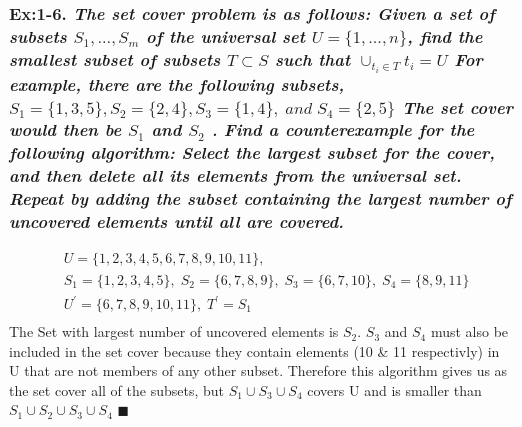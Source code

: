 \subsubsection*{\textbf{\enspace Ex:1-6.} \emph{\textbf{The set cover problem is as follows: } Given a set of subsets $S_{1}, ..., S_{m}$ of the universal set 
$U = \{1, ..., n\}$, 
find the smallest subset of subsets 
$T \subset S$ 
such that  
$\cup_{t_{i} \in T}t_{i} = U$ For example, there are the following subsets, $S_{1} = \{1, 3, 5\}, S_{2} = \{2, 4\}, S_{3} = \{1, 4\}, \; and \; S_{4} = \{2, 5\}$ The set cover would then be $S_{1}$ and $S_{2}$ . } 
\emph{\textbf{Find a counterexample for the following algorithm:} Select the largest subset for the cover, and then delete all its elements from the universal set. Repeat by adding the subset containing the largest number of uncovered elements until all are covered.}}
{\color{answer}{}
\begin{align*}
	&U = \{1,2,3,4,5,6,7,8,9,10,11\}, \\
	&S_{1} = \{1,2,3,4,5\}, \; S_{2} = \{6,7,8,9\}, \; S_{3} = \{6,7,10\}, \; S_{4} = \{8,9,11\} \\
	&U^{'} = \{6,7,8,9,10,11\}, \; T^{'} = S_{1} \\
\end{align*}
The Set with largest number of uncovered elements is $S_{2}$. $S_{3}$ and $S_{4}$ must also be included in the set cover because they contain elements (10 \& 11 respectivly)
in U that are not members of any other subset. Therefore this algorithm gives us as the set cover all of the subsets, but $S_{1} \cup S_{3} \cup S_{4}$ covers U and is smaller
than $S_{1} \cup S_{2} \cup S_{3} \cup S_{4}$
}
$\blacksquare$







